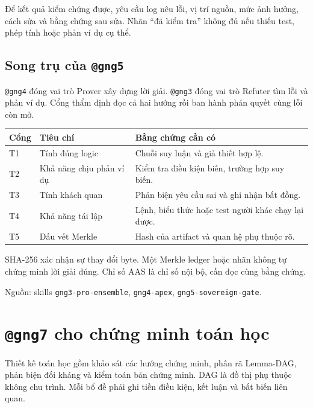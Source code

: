 \documentclass[11pt,a4paper]{article}
\makeatletter
\newcommand{\agent}[1]{\texttt{@gng#1}}
\newcommand{\srcref}[1]{\par{\small\color{muted}Nguồn: #1.}\par}
\newcommand{\keypoint}[1]{\par\smallskip\noindent\colorbox{pale}{\parbox{\dimexpr\linewidth-2\fboxsep\relax}{\color{forest}#1}}\par\smallskip}
\newcommand{\code}[1]{\texttt{\detokenize{#1}}}
\makeatother
\begin{document}
Để kết quả kiểm chứng được, yêu cầu log nêu lỗi, vị trí nguồn, mức ảnh hưởng, cách sửa và bằng chứng sau sửa. Nhãn ``đã kiểm tra'' không đủ nếu thiếu test, phép tính hoặc phản ví dụ cụ thể.

\subsection{Song trụ của \agent{5}}
\agent{4} đóng vai trò Prover xây dựng lời giải. \agent{3} đóng vai trò Refuter tìm lỗi và phản ví dụ. Cổng thẩm định đọc cả hai hướng rồi ban hành phán quyết cùng lỗi còn mở.

\begin{tabularx}{\linewidth}{@{}p{1.1cm}p{4.6cm}Y@{}}
\toprule
\textbf{Cổng}&\textbf{Tiêu chí}&\textbf{Bằng chứng cần có}\\\midrule
T1&Tính đúng logic&Chuỗi suy luận và giả thiết hợp lệ.\\[0.5em]
T2&Khả năng chịu phản ví dụ&Kiểm tra điều kiện biên, trường hợp suy biến.\\[0.5em]
T3&Tính khách quan&Phản biện yêu cầu sai và ghi nhận bất đồng.\\[0.5em]
T4&Khả năng tái lập&Lệnh, biểu thức hoặc test người khác chạy lại được.\\[0.5em]
T5&Dấu vết Merkle&Hash của artifact và quan hệ phụ thuộc rõ.\\
\bottomrule
\end{tabularx}

\keypoint{SHA-256 xác nhận sự thay đổi byte. Một Merkle ledger hoặc nhãn \code{SOVEREIGN_PASSED} không tự chứng minh lời giải đúng. Chỉ số AAS là chỉ số nội bộ, cần đọc cùng bằng chứng.}
\srcref{skills \texttt{gng3-pro-ensemble}, \texttt{gng4-apex}, \texttt{gng5-sovereign-gate}}
\newpage

\section{\agent{7} cho chứng minh toán học}
Thiết kế toán học gồm khảo sát các hướng chứng minh, phân rã Lemma-DAG, phản biện đối kháng và kiểm toán bản chứng minh. DAG là đồ thị phụ thuộc không chu trình. Mỗi bổ đề phải ghi tiền điều kiện, kết luận và bất biến liên quan.

\begin{center}
\par
\end{center}
\end{document}
